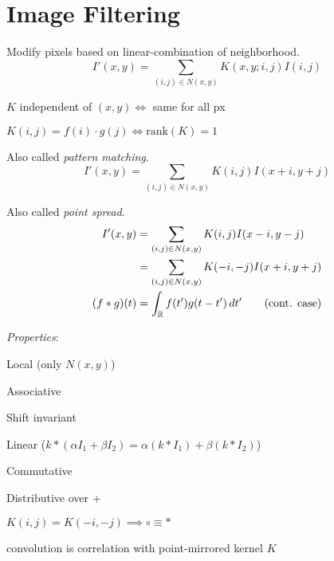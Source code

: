 \section{Image Filtering}
Modify pixels based on linear-combination of neighborhood.
\[I'(x, y) = \sum_{(i, j) \in N(x, y)} K(x, y; i, j)I(i, j)\]

\begin{definition}
  \(K\) independent of \((x, y) \iff\) same for all px
\end{definition}

\begin{definition}[Separable \(K\)]
  \(K(i, j) = f(i) \cdot g(j) \iff \text{rank}(K) = 1\)
\end{definition}

\begin{definition}
  Also called \textit{pattern matching}.
  \[I'(x, y) = \sum_{(i, j) \in N(x, y)} K(i, j) I(x + i, y + j)\]
\end{definition}

\begin{definition}
  Also called \textit{point spread}.
  \begin{align*}
    I'(x, y) &= \sum_{(i, j) \in N(x, y)} K(i, j) I(x - i, y - j) \\
    &= \sum_{(i, j) \in N(x, y)} K(-i, -j) I(x + i, y + j) \\
  (f \ast g)(t) &= \int_{\operatorname{\mathbb{R}}} f(t')g(t - t') \, dt' \qquad (\text{cont. case})
  \end{align*}

  \textit{Properties}:
  \begin{itemize*}
    \item Local (only \(N(x, y)\))
    \item Associative
    \item Shift invariant
    \item Linear (\(k \ast (\alpha I_1 + \beta I_2) = \alpha(k \ast I_1) + \beta(k \ast I_2)\))
    \item Commutative
    \item Distributive over +
  \end{itemize*}
\end{definition}

\begin{theorems}
  \begin{itemize*}
    \item \(K(i, j) = K(-i, -j) \implies \circ \equiv \ast\) \\
    \item convolution is correlation with point-mirrored kernel \(K\)
  \end{itemize*}
\end{theorems}

